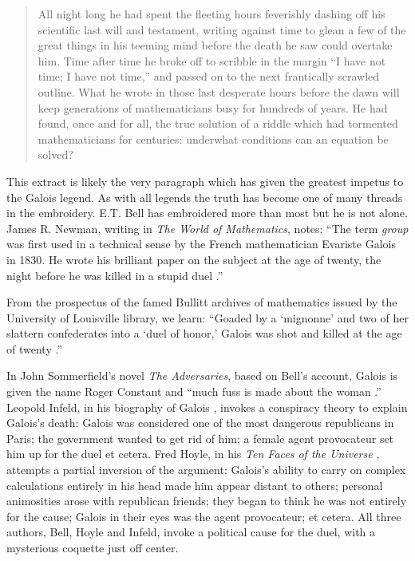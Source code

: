 \documentclass[12pt]{article}
\begin{document}
\begin{quote}
All night long he had spent the fleeting hours feverishly dashing off his scientific last will and testament, writing against time to glean a few of the great things in his teeming mind before the death he saw could overtake him. Time after time he broke off to scribble in the margin ``I have not time; I have not time,'' and passed on to the next frantically scrawled outline. What he wrote in those last desperate hours before the dawn will keep generations of mathematicians busy for hundreds of years. He had found, once and for all, the true solution of a riddle which had tormented mathematicians for centuries: underwhat conditions can an equation be solved? \cite{2}
\end{quote}
This extract is likely the very paragraph which has given the greatest impetus to the Galois legend. As with all legends the truth has become one of many threads in the embroidery. E.T. Bell has embroidered more than most but he is not alone. James R. Newman, writing in {\it The World of Mathematics}, notes: ``The term {\it group} was first used in a technical sense by the French mathematician Evariste Galois in 1830. He wrote his brilliant paper on the subject at the age of twenty, the night before he was killed in a stupid duel \cite{3}.'' 

From the prospectus of the famed Bullitt archives of mathematics issued by the University of Louisville library, we learn: ``Goaded by a `mignonne' and two of her slattern confederates into a `duel of honor,' Galois was shot and killed at the age of twenty \cite{4}.'' 

In John Sommerfield's novel \emph{The Adversaries}, based on Bell's account, Galois is given the name Roger Constant and ``much fuss is made about the woman \cite{5}.''  Leopold Infeld, in his biography of Galois \cite{6}, invokes a conspiracy theory to explain Galois's death: Galois was considered one of the most dangerous republicans in Paris; the government wanted to get rid of him; a female agent provocateur set him up for the duel et cetera. Fred Hoyle, in his \emph{Ten Faces of the Universe} \cite{7}, attempts a partial inversion of the argument: Galois's ability to carry on complex calculations entirely in his head made him appear distant to others; personal animosities arose with republican friends; they began to think he was not entirely for the cause; Galois in their eyes was the agent provocateur; et cetera. All three authors, Bell, Hoyle and Infeld, invoke a political cause for the duel, with a mysterious coquette just off center.
\end{document}
